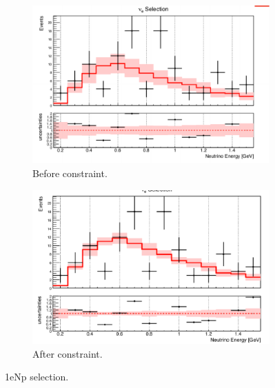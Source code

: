 \begin{figure}[H] 
\begin{center}
    \begin{subfigure}[b]{0.45\textwidth}
    \centering
    \includegraphics[width=1.00\textwidth]{Fakedata/set2/np_before_constrain.pdf}
    \caption{\label{fig:fakedata:set2:np_before_constrain} Before constraint.}
    \end{subfigure}
    \begin{subfigure}[b]{0.45\textwidth}
    \centering
    \includegraphics[width=1.00\textwidth]{Fakedata/set2/np_after_constrain.pdf}
    \caption{\label{fig:fakedata:set2:np_after_constrain} After constraint.}
    \end{subfigure}
\caption{\label{fig:fakedata:set2:np_const} 1eNp selection.}
\end{center}
\end{figure}

